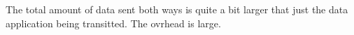 The total amount of data sent both ways is quite a bit larger that just the data application being transitted. The ovrhead is large.
